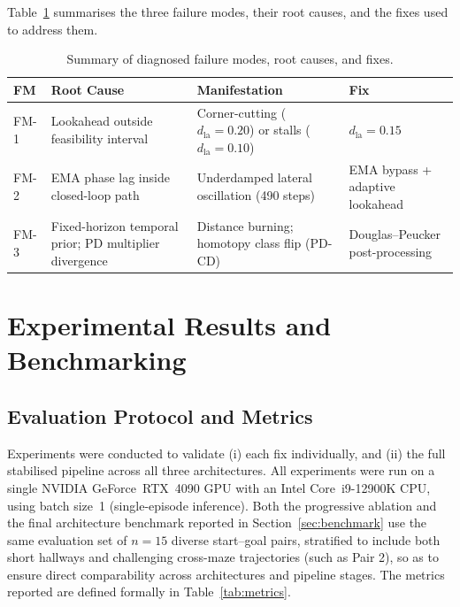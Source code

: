 \documentclass[12pt, a4paper, oneside]{report}
\theoremstyle{definition}
\newcommand{\dlookahead}{d_{\mathrm{la}}}
\begin{document}
Table~\ref{tab:fm_summary} summarises the three failure modes,
their root causes, and the fixes used to address them.

\begin{table}[H]
\centering
\small
\caption{Summary of diagnosed failure modes, root causes,
  and fixes.}
\label{tab:fm_summary}
\begin{tabularx}{\linewidth}{@{}lXXX@{}}
\toprule
\textbf{FM} &
\textbf{Root Cause} &
\textbf{Manifestation} &
\textbf{Fix} \\
\midrule
FM-1 &
Lookahead outside feasibility interval &
Corner-cutting ($\dlookahead{=}0.20$) or stalls ($\dlookahead{=}0.10$) &
$\dlookahead{=}0.15$ \\[6pt]
FM-2 &
EMA phase lag inside closed-loop path &
Underdamped lateral oscillation (490 steps) &
EMA bypass + adaptive lookahead \\[6pt]
FM-3 &
Fixed-horizon temporal prior; PD multiplier divergence &
Distance burning; homotopy class flip (PD-CD) &
Douglas--Peucker post-processing \\
\bottomrule
\end{tabularx}
\end{table}

\chapter{Experimental Results and Benchmarking}
\label{chap:results}

\section{Evaluation Protocol and Metrics}
\label{sec:eval}

Experiments were conducted to validate (i) each fix individually,
and (ii) the full stabilised pipeline across all three
architectures. All experiments were run on a single NVIDIA
GeForce~RTX~4090 GPU with an Intel Core~i9-12900K CPU, using batch
size~1 (single-episode inference). Both the progressive ablation
and the final architecture benchmark reported in
Section~\ref{sec:benchmark} use the same evaluation set of
$n = 15$ diverse start--goal pairs, stratified to include both
short hallways and challenging cross-maze trajectories (such as
Pair 2), so as to ensure direct comparability across architectures
and pipeline stages. The metrics reported are defined formally in
Table~\ref{tab:metrics}.
\end{document}

